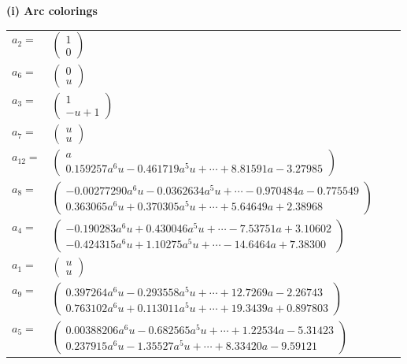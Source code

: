 \documentclass[1p]{elsarticle_modified}
\theoremstyle{definition}
\begin{document}
\flushleft \textbf{(i) Arc colorings}\\
\begin{tabular}{m{7pt} m{180pt} m{7pt} m{180pt} }
\flushright $a_{2}=$&$\begin{pmatrix}1\\0\end{pmatrix}$ \\
\flushright $a_{6}=$&$\begin{pmatrix}0\\u\end{pmatrix}$ \\
\flushright $a_{3}=$&$\begin{pmatrix}1\\- u+1\end{pmatrix}$ \\
\flushright $a_{7}=$&$\begin{pmatrix}u\\u\end{pmatrix}$ \\
\flushright $a_{12}=$&$\begin{pmatrix}a\\0.159257 a^{6} u-0.461719 a^{5} u+\cdots+8.81591 a-3.27985\end{pmatrix}$ \\
\flushright $a_{8}=$&$\begin{pmatrix}-0.00277290 a^{6} u-0.0362634 a^{5} u+\cdots-0.970484 a-0.775549\\0.363065 a^{6} u+0.370305 a^{5} u+\cdots+5.64649 a+2.38968\end{pmatrix}$ \\
\flushright $a_{4}=$&$\begin{pmatrix}-0.190283 a^{6} u+0.430046 a^{5} u+\cdots-7.53751 a+3.10602\\-0.424315 a^{6} u+1.10275 a^{5} u+\cdots-14.6464 a+7.38300\end{pmatrix}$ \\
\flushright $a_{1}=$&$\begin{pmatrix}u\\u\end{pmatrix}$ \\
\flushright $a_{9}=$&$\begin{pmatrix}0.397264 a^{6} u-0.293558 a^{5} u+\cdots+12.7269 a-2.26743\\0.763102 a^{6} u+0.113011 a^{5} u+\cdots+19.3439 a+0.897803\end{pmatrix}$ \\
\flushright $a_{5}=$&$\begin{pmatrix}0.00388206 a^{6} u-0.682565 a^{5} u+\cdots+1.22534 a-5.31423\\0.237915 a^{6} u-1.35527 a^{5} u+\cdots+8.33420 a-9.59121\end{pmatrix}$ \\

\end{tabular}
\end{document}
